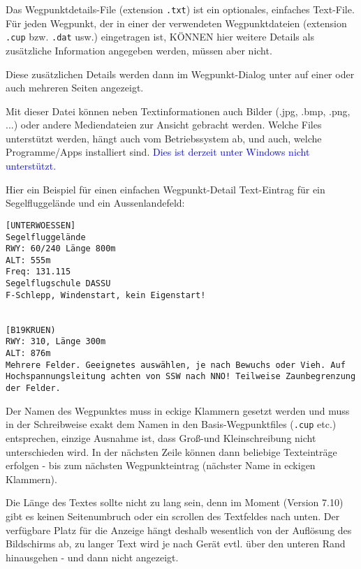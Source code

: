 %
%
%

Das Wegpunktdetails-File (extension \verb|.txt|) ist ein optionales, einfaches Text-File. Für jeden Wegpunkt, der in einer der verwendeten Wegpunktdateien (extension \verb|.cup| bzw. \verb|.dat| usw.) eingetragen ist, KÖNNEN hier weitere Details als zusätzliche Information angegeben werden, müssen aber nicht. 

Diese zusätzlichen Details werden dann im Wegpunkt-Dialog unter  auf einer oder auch mehreren Seiten angezeigt.

Mit dieser Datei können neben Textinformationen auch Bilder (.jpg, .bmp, .png, ...) oder andere Mediendateien zur Ansicht gebracht werden. Welche Files unterstützt werden, hängt auch vom Betriebssystem ab, und auch, welche Programme/Apps installiert sind. \textcolor{blue}{Dies ist derzeit unter Windows nicht unterstützt.} 

Hier ein Beispiel für einen einfachen Wegpunkt-Detail Text-Eintrag für ein Segelfluggelände und ein
Aussenlandefeld:

\begin{verbatim}
[UNTERWOESSEN]
Segelfluggelände
RWY: 60/240 Länge 800m
ALT: 555m
Freq: 131.115
Segelflugschule DASSU 
F-Schlepp, Windenstart, kein Eigenstart!


[B19KRUEN)
RWY: 310, Länge 300m
ALT: 876m
Mehrere Felder. Geeignetes auswählen, je nach Bewuchs oder Vieh. Auf Hochspannungsleitung achten von SSW nach NNO! Teilweise Zaunbegrenzung der Felder.
\end{verbatim}



Der Namen des Wegpunktes muss in eckige Klammern gesetzt werden und muss in der Schreibweise exakt dem Namen in den Basis-Wegpunktfiles (\verb|.cup| etc.) entsprechen, einzige Ausnahme ist, dass Groß-und Kleinschreibung nicht unterschieden wird.
In der nächsten Zeile können dann beliebige Texteinträge erfolgen - bis zum nächsten Wegpunkteintrag (nächster Name in eckigen Klammern).

Die Länge des Textes sollte nicht zu lang sein, denn im Moment (Version 7.10) gibt es keinen Seitenumbruch oder ein scrollen des Textfeldes nach unten. Der verfügbare Platz für die Anzeige hängt deshalb wesentlich von der Auflösung des Bildschirms ab, zu langer Text wird je nach Gerät evtl. über den unteren Rand hinausgehen - und dann nicht angezeigt.

